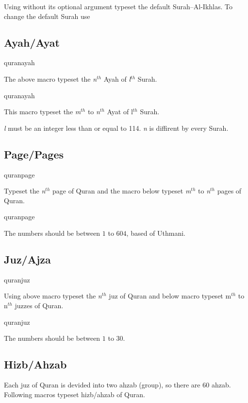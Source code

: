 \documentclass{ltxdoc}
\begin{document}
Using  without its optional argument typeset the default Surah--Al-Ikhlas.
To change the default Surah use 

\subsection{Ayah/Ayat}
\begin{declcs}{quranayah}
\end{declcs}
The above macro typeset the \textit{n}$^{th}$ Ayah of \textit{l}$^{th}$ Surah. 

\begin{declcs}{quranayah}
\end{declcs}
This macro typeset the \textit{m}$^{th}$ to \textit{n}$^{th}$ Ayat of l$^{th}$ Surah. 

\textit{l} must be an integer less than or equal to 114. \textit{n} is diffirent by every Surah. 

\subsection{Page/Pages}
\begin{declcs}{quranpage}
\end{declcs}
Typeset the \textit{n}$^{th}$ page of Quran and the macro below typeset \textit{m}$^{th}$ to 
\textit{n}$^{th}$ pages of Quran. 

\begin{declcs}{quranpage}
\end{declcs}
The numbers should be between $1$ to $604$, based of Uthmani. 

\subsection{Juz/Ajza}
\begin{declcs}{quranjuz}
\end{declcs}
Using above macro typeset the \textit{n}$^{th}$ juz of Quran and below macro typeset m$^{th}$ to n$^{th}$ juzzes of Quran. 
\begin{declcs}{quranjuz}
\end{declcs}
The numbers should be between $1$ to $30$.

\subsection{Hizb/Ahzab}
Each juz of Quran is devided into two ahzab (group),  so there are 60 ahzab.
Following macros typeset hizb/ahzab of Quran. 
\end{document}
